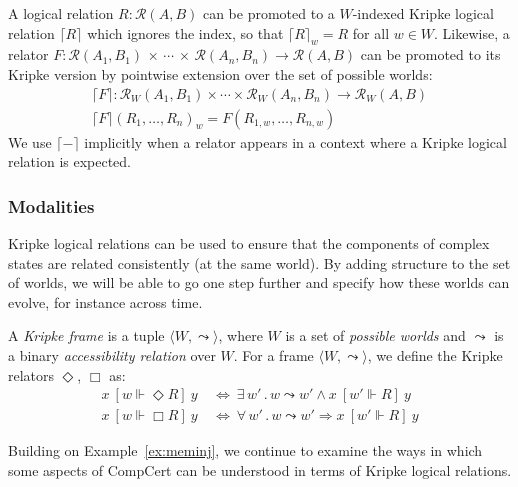 \documentclass[sigplan,10pt,review,anonymous]{acmart}
\newcommand{\ifr}[1]{\ [{#1}]\ }
\begin{document}
A logical relation $R : \mathcal{R}(A, B)$
can be promoted to a $W$-indexed Kripke logical relation $\lceil R \rceil$
which ignores the index, so that $\lceil R \rceil_w = R$ for all $w \in W$.
Likewise,
a relator
  $F : \mathcal{R}(A_1, B_1) \,\times\,\cdots\,\times\,\mathcal{R}(A_n, B_n) \rightarrow \mathcal{R}(A, B)$
can be promoted to its Kripke version
by pointwise extension over the set of possible worlds:
\begin{gather*}
  \lceil F \rceil : \mathcal{R}_W(A_1, B_1) \times \cdots \times \mathcal{R}_W(A_n, B_n) \rightarrow \mathcal{R}_W(A, B) \\
  \lceil F \rceil (R_1, \ldots, R_n)_w = F(R_{1,w}, \ldots, R_{n,w})
\end{gather*}
We use $\lceil - \rceil$ implicitly
when a relator appears in a context where
a Kripke logical relation is expected.

\subsubsection{Modalities}

Kripke logical relations
can be used to ensure that the components of complex states
are related consistently (at the same world).
By adding structure to the set of worlds,
we will be able to go one step further and
specify how these worlds can evolve,
for instance across time.

\begin{definition} %
A \emph{Kripke frame} is a tuple
$\langle W, {\leadsto} \rangle$, where
$W$ is a set of \emph{possible worlds} and
$\leadsto$ is a
binary \emph{accessibility relation} over $W$.
For a frame
$\langle W, \leadsto \rangle$,
we define the Kripke relators $\Diamond$, $\Box$ as:
\begin{align*}
  x \ifr{w \Vdash \Diamond R} y & \: \Leftrightarrow \:
    \exists \, w' \,.\, w \leadsto w' \wedge
      x \ifr{w' \Vdash R} y \\
  x \ifr{w \Vdash \Box R} y & \: \Leftrightarrow \:
    \forall \, w' \,.\, w \leadsto w' \Rightarrow
      x \ifr{w' \Vdash R} y
\end{align*}
\end{definition}

Building on Example~\ref{ex:meminj},
we continue to examine the ways in which
some aspects of CompCert can be understood
in terms of Kripke logical relations.
\end{document}
